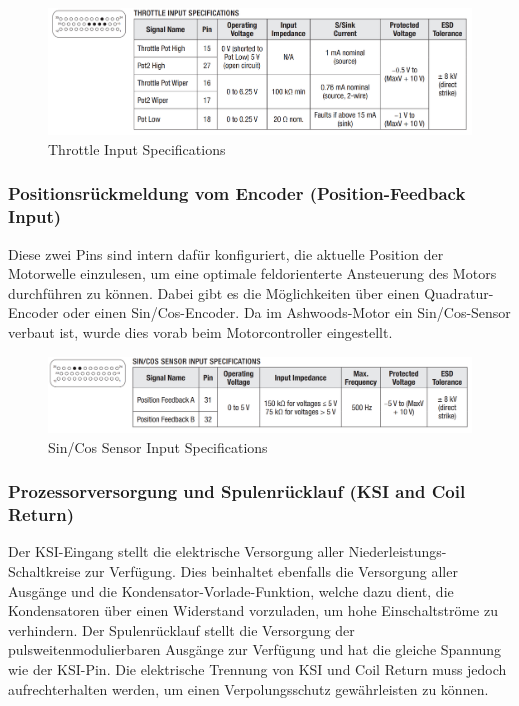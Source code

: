 \begin{figure}[H]
	\begin{center}
		\includegraphics[width=\textwidth]{figures/antrieb/Throttle_Input_Specifications.png}
		\caption{Throttle Input Specifications}
	\end{center}
\end{figure}



\subsubsection{Positionsrückmeldung vom Encoder (Position-Feedback Input)}
Diese zwei Pins sind intern dafür konfiguriert, die aktuelle Position der Motorwelle einzulesen, um eine optimale feldorienterte Ansteuerung des Motors durchführen zu können. Dabei gibt es die Möglichkeiten über einen Quadratur-Encoder oder einen Sin/Cos-Encoder. Da im Ashwoods-Motor ein Sin/Cos-Sensor verbaut ist, wurde dies vorab beim Motorcontroller eingestellt.

\begin{figure}[H]
	\begin{center}
		\includegraphics[width=\textwidth]{figures/antrieb/SinCosSensor_Input_Specifications.png}
		\caption{Sin/Cos Sensor Input Specifications}
	\end{center}
\end{figure}


\newpage


\subsubsection{Prozessorversorgung und Spulenrücklauf (KSI and Coil Return)}
Der KSI-Eingang stellt die elektrische Versorgung aller Niederleistungs-Schaltkreise zur Verfügung. Dies  beinhaltet ebenfalls die Versorgung aller Ausgänge und die Kondensator-Vorlade-Funktion, welche dazu dient, die Kondensatoren über einen Widerstand vorzuladen, um hohe Einschaltströme zu verhindern. Der Spulenrücklauf stellt die Versorgung der pulsweitenmodulierbaren Ausgänge zur Verfügung und hat die gleiche Spannung wie der KSI-Pin. Die elektrische Trennung von KSI und Coil Return muss jedoch aufrechterhalten werden, um einen Verpolungsschutz gewährleisten zu können. 

